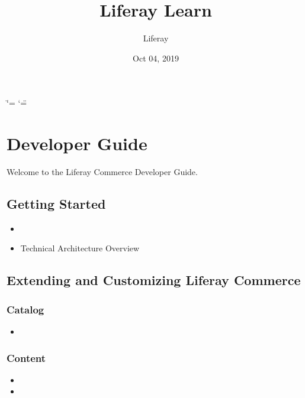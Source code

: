 \documentclass[letterpaper,10pt,english]{sphinxmanual}
\title{Liferay Learn}
\date{Oct 04, 2019}
\author{Liferay}
\begin{document}
\ifdefined\shorthandoff
  \ifnum\catcode`\=\string=\active\shorthandoff{=}\fi
  \ifnum\catcode`\"=\active{}\fi
\fi

\pagestyle{empty}
\sphinxmaketitle
\pagestyle{plain}
\sphinxtableofcontents
\pagestyle{normal}
\label{\detokenize{contents::doc}}



\chapter{Developer Guide}
\label{\detokenize{product/developer-guide/README:developer-guide}}\label{\detokenize{product/developer-guide/README::doc}}
Welcome to the Liferay Commerce Developer Guide.


\section{Getting Started}
\label{\detokenize{product/developer-guide/README:getting-started}}\begin{itemize}
\item {} 

\item {} 
Technical Architecture Overview

\end{itemize}


\section{Extending and Customizing Liferay Commerce}
\label{\detokenize{product/developer-guide/README:extending-and-customizing-liferay-commerce}}

\subsection{Catalog}
\label{\detokenize{product/developer-guide/README:catalog}}\begin{itemize}
\item {} 

\end{itemize}


\subsection{Content}
\label{\detokenize{product/developer-guide/README:content}}\begin{itemize}
\item {} 

\item {} 

\end{itemize}
\end{document}
